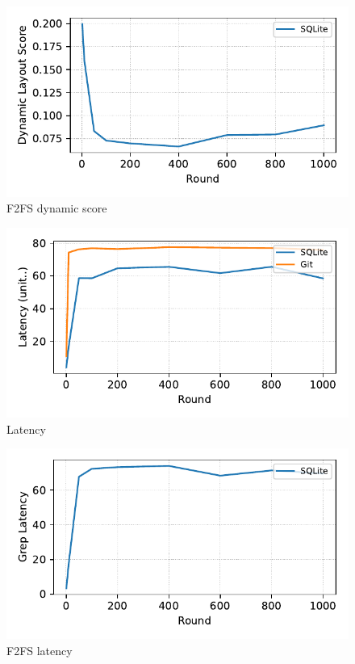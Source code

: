 \begin{figure}[t]
    \centering
    \includegraphics[width=0.95\columnwidth]{graphs/py_graph/dynamic-f2fs}
    \caption{F2FS dynamic score}
    \label{fig:f2fs_dynamic_score}
\end{figure}


\begin{figure}[t]
    \centering
    \includegraphics[width=0.95\columnwidth]{graphs/py_graph/latency}
    \caption{Latency}
    \label{fig:latency}
\end{figure}

\begin{figure}[t]
    \centering
    \includegraphics[width=0.95\columnwidth]{graphs/py_graph/latency-f2fs}
    \caption{F2FS latency}
    \label{fig:f2fs_latency}
\end{figure}
